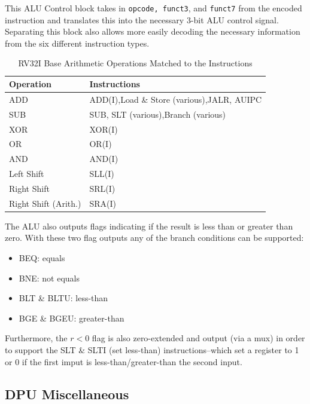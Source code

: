 \documentclass[lettersize,journal]{IEEEtran}
\begin{document}
This ALU Control block takes in \verb|opcode, funct3|, and \verb|funct7| from the encoded instruction and translates this into the necessary 3-bit ALU control signal.
Separating this block also allows more easily decoding the necessary information from the six different \cite{riscvunprovisioned} instruction types.
\begin{table}
    \label{table:ALUOps}
    \centering
    \begin{tabular}{|p{2.7cm}|p{4cm}|}
        \hline
        Operation & Instructions \\
        \hline\hline
        ADD & ADD(I),\newline Load \& Store (various),\newline JALR, AUIPC\\
        SUB & SUB, SLT (various),\newline Branch (various)\\
        XOR & XOR(I)\\
        OR & OR(I)\\
        AND & AND(I)\\
        Left Shift & SLL(I)\\
        Right Shift & SRL(I)\\
        Right Shift (Arith.) & SRA(I)\\
        \hline
    \end{tabular}
    \caption{RV32I Base Arithmetic Operations Matched to the Instructions}
\end{table}

The ALU also outputs flags indicating if the result is less than or greater than zero.
With these two flag outputs any of the branch conditions can be supported:
\begin{itemize}
    \item BEQ: equals
    \item BNE: not equals
    \item BLT \& BLTU: less-than
    \item BGE \& BGEU: greater-than
\end{itemize}
Furthermore, the $r<0$ flag is also zero-extended and output (via a mux) in order to support the SLT \& SLTI (set less-than) instructions--which set a register to 1
or 0 if the first imput is less-than/greater-than the second input.

\subsection{DPU Miscellaneous}
\color{red}{TBD}\color{black}
\end{document}
